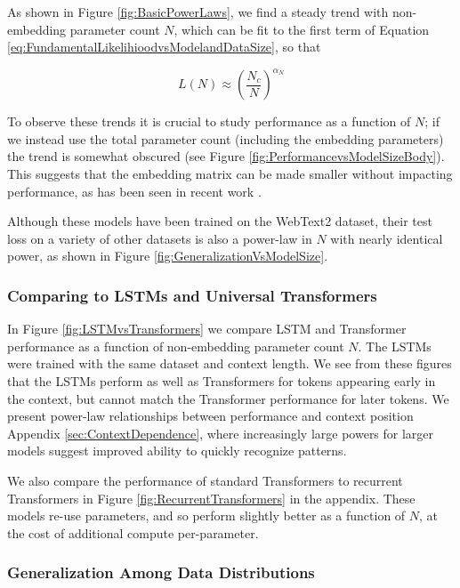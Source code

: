 As shown in  Figure \ref{fig:BasicPowerLaws}, we find a steady trend with non-embedding parameter count $N$, which can be fit to the first term of Equation \eqref{eq:FundamentalLikelihioodvsModelandDataSize}, so that

\begin{equation}
L(N) \approx \left( \frac{N_c}{N} \right)^{ \alpha_N }
\end{equation}

  
To observe these trends it is crucial to study performance as a function of $N$; if we instead use the total parameter count (including the embedding parameters) the trend is somewhat obscured (see Figure \ref{fig:PerformancevsModelSizeBody}).  This suggests that the embedding matrix can be made smaller without impacting performance, as has been seen in recent work \cite{lan2019albert}.

Although these models have been trained on the WebText2 dataset, their test loss on a variety of other datasets is also a power-law in $N$ with nearly identical power, as shown in Figure \ref{fig:GeneralizationVsModelSize}.  

\subsubsection{Comparing to LSTMs and Universal Transformers}

In Figure \ref{fig:LSTMvsTransformers} we compare LSTM and Transformer performance as a function of non-embedding parameter count $N$. The LSTMs were trained with the same dataset and context length.  We see from these figures that the LSTMs perform as well as Transformers for tokens appearing early in the context, but cannot match the Transformer performance for later tokens.  We present power-law relationships between performance and context position Appendix \ref{sec:ContextDependence}, where increasingly large powers for larger models suggest improved ability to quickly recognize patterns.

We also compare the performance of standard Transformers to recurrent Transformers \cite{DBLP:journals/corr/abs-1807-03819} in Figure \ref{fig:RecurrentTransformers} in the appendix.  These models re-use parameters, and so perform slightly better as a function of $N$, at the cost of additional compute per-parameter.

\subsubsection{Generalization Among Data Distributions}
\label{sec:GeneralizationtoOtherDistributions}

